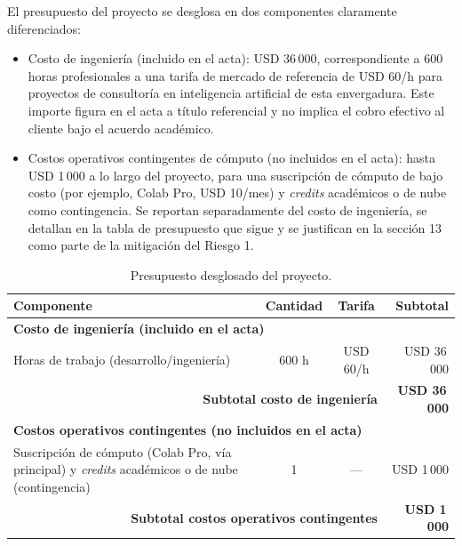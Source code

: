 \documentclass[
  11pt, %
]{charter}
\begin{document}
El presupuesto del proyecto se desglosa en dos componentes claramente diferenciados:

\begin{itemize}
  \item Costo de ingeniería (incluido en el acta): USD 36\,000, correspondiente a 600 horas profesionales a una tarifa de mercado de referencia de USD 60/h para proyectos de consultoría en inteligencia artificial de esta envergadura. Este importe figura en el acta a título referencial y no implica el cobro efectivo al cliente bajo el acuerdo académico.
  \item Costos operativos contingentes de cómputo (no incluidos en el acta): hasta USD 1\,000 a lo largo del proyecto, para una suscripción de cómputo de bajo costo (por ejemplo, Colab Pro, USD 10/mes) y \textit{credits} académicos o de nube como contingencia. Se reportan separadamente del costo de ingeniería, se detallan en la tabla de presupuesto que sigue y se justifican en la sección 13 como parte de la mitigación del Riesgo 1.
\end{itemize}

\begin{table}[ht]
  \centering
  \caption{Presupuesto desglosado del proyecto.}
  \label{tab:presupuesto}
  \begin{tabularx}{\linewidth}{@{}|X|c|c|r|@{}}
    \hline
    \rowcolor[HTML]{C0C0C0}
    Componente & Cantidad & Tarifa & Subtotal \\
    \hline
    \multicolumn{4}{|l|}{\cellcolor[HTML]{EEEEEE}\textbf{Costo de ingeniería (incluido en el acta)}} \\
    \hline
    Horas de trabajo (desarrollo/ingeniería) & 600 h & USD 60/h & USD 36\,000 \\
    \hline
    \multicolumn{3}{|r|}{\textbf{Subtotal costo de ingeniería}} & \textbf{USD 36\,000} \\
    \hline
    \multicolumn{4}{|l|}{\cellcolor[HTML]{EEEEEE}\textbf{Costos operativos contingentes (no incluidos en el acta)}} \\
    \hline
    Suscripción de cómputo (Colab Pro, vía principal) y \textit{credits} académicos o de nube (contingencia) & 1 & --- & USD 1\,000 \\
    \hline
    \multicolumn{3}{|r|}{\textbf{Subtotal costos operativos contingentes}} & \textbf{USD 1\,000} \\
    \hline
  \end{tabularx}
\end{table}
\end{document}
